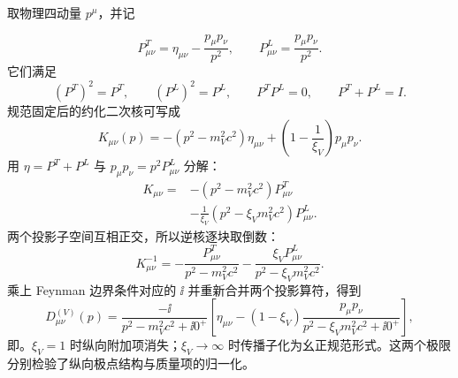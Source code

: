 \begin{derivation}[横纵投影给出的有质量矢量传播子]
取物理四动量 $p^\mu$，并记

\begin{equation*}
 P^T_{\mu\nu}=\eta_{\mu\nu}-\frac{p_\mu p_\nu}{p^2},
 \qquad
 P^L_{\mu\nu}=\frac{p_\mu p_\nu}{p^2}.
\end{equation*}
它们满足
\begin{equation*}
 (P^T)^2=P^T,
 \qquad
 (P^L)^2=P^L,
 \qquad
 P^TP^L=0,
 \qquad
 P^T+P^L=I.
\end{equation*}
规范固定后的约化二次核可写成
\begin{equation*}
 K_{\mu\nu}(p)
 =-(p^2-m_V^2c^2)\eta_{\mu\nu}
 +\left(1-\frac1{\xi_V}\right)p_\mu p_\nu.
\end{equation*}
用 $\eta=P^T+P^L$ 与 $p_\mu p_\nu=p^2P^L_{\mu\nu}$ 分解：
\begin{align*}
 K_{\mu\nu}
 ={}&-(p^2-m_V^2c^2)P^T_{\mu\nu}\\
 &-\frac1{\xi_V}(p^2-\xi_Vm_V^2c^2)P^L_{\mu\nu}.
\end{align*}
两个投影子空间互相正交，所以逆核逐块取倒数：
\begin{equation*}
 K^{-1}_{\mu\nu}
 =-\frac{P^T_{\mu\nu}}{p^2-m_V^2c^2}
 -\frac{\xi_VP^L_{\mu\nu}}{p^2-\xi_Vm_V^2c^2}.
\end{equation*}
乘上 Feynman 边界条件对应的 $\ii$ 并重新合并两个投影算符，得到
\begin{equation*}
 D^{(V)}_{\mu\nu}(p)
 =\frac{-\ii}{p^2-m_V^2c^2+\ii0^+}
 \left[
 \eta_{\mu\nu}
 -(1-\xi_V)
 \frac{p_\mu p_\nu}{p^2-\xi_Vm_V^2c^2+\ii0^+}
 \right],
\end{equation*}
即。$\xi_V=1$ 时纵向附加项消失；$\xi_V\to\infty$ 时传播子化为幺正规范形式。这两个极限分别检验了纵向极点结构与质量项的归一化。
\end{derivation}

